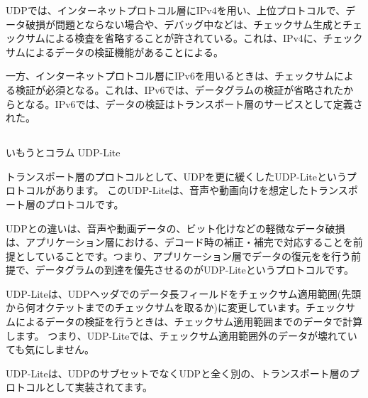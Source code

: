 UDPでは、インターネットプロトコル層にIPv4を用い、上位プロトコルで、データ破損が問題とならない場合や、デバッグ中などは、チェックサム生成とチェックサムによる検査を省略することが許されている。これは、IPv4に、チェックサムによるデータの検証機能があることによる。

一方、インターネットプロトコル層にIPv6を用いるときは、チェックサムによる検証が必須となる。これは、IPv6では、データグラムの検証が省略されたからとなる。IPv6では、データの検証はトランスポート層のサービスとして定義された。



\subsection*{}
\begin{itembox}[l]{いもうとコラム UDP-Lite}

トランスポート層のプロトコルとして、UDPを更に緩くしたUDP-Liteというプロトコルがあります。
このUDP-Liteは、音声や動画向けを想定したトランスポート層のプロトコルです。

UDPとの違いは、音声や動画データの、ビット化けなどの軽微なデータ破損は、アプリケーション層における、デコード時の補正・補完で対応することを前提としていることです。つまり、アプリケーション層でデータの復元をを行う前提で、データグラムの到達を優先させるのがUDP-Liteというプロトコルです。

UDP-Liteは、UDPヘッダでのデータ長フィールドをチェックサム適用範囲(先頭から何オクテットまでのチェックサムを取るか)に変更しています。チェックサムによるデータの検証を行うときは、チェックサム適用範囲までのデータで計算します。
つまり、UDP-Liteでは、チェックサム適用範囲外のデータが壊れていても気にしません。

UDP-Liteは、UDPのサブセットでなくUDPと全く別の、トランスポート層のプロトコルとして実装されてます。


\end{itembox}



